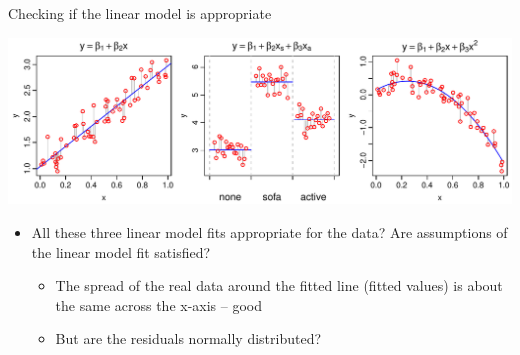 \documentclass[xcolor=x11names,handout,compress]{beamer}
\renewcommand{\(}{\begin{columns}}
\renewcommand{\)}{\end{columns}}
\newcommand{\<}[1]{\begin{column}{#1}}
\renewcommand{\>}{\end{column}}
\begin{document}

\begin{frame}{Checking if the linear model is appropriate}

\includegraphics[width=\textwidth]{ConstantVarianceMods.pdf}

\begin{itemize}[<+->]
\item All these three linear model fits appropriate for the data? Are assumptions of the linear model fit satisfied?
\pause
\begin{itemize}[<+->]\itemsep6pt
    \item The spread of the real data around the fitted line (fitted values) is about the same across the x-axis -- good
    \item But are the residuals normally distributed?
\end{itemize}
\end{itemize}

\end{frame}

\end{document}
